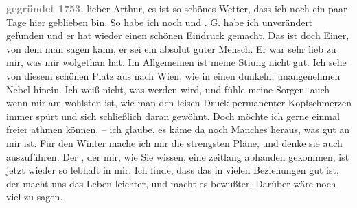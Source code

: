 \pstart
           \textcolor{gray}{\textbf{\textbf{gegründet 1753.}}}\pend
           \vspace{0.5em}
\pstart
           lieber Arthur, es ist so schönes Wetter, dass ich noch ein paar Tage
                  hier geblieben bin. So habe
               ich noch \label{K_L03274-1v}\label{K_L03274-1} und \label{K_L03274-2v}\label{K_L03274-2}. G. habe ich unverändert gefunden und
               er hat wieder einen schönen Eindruck gemacht. Das ist doch Einer, von dem man sagen
               kann, er sei ein absolut guter Mensch. Er war sehr lieb zu mir, was mir wolgethan
               hat. Im Allgemeinen ist meine Sti{\geminationm}ung nicht gut. Ich
               sehe von diesem schönen Platz aus nach Wien\textcolor{gray}{,} wie in einen dunkeln, unangenehmen Nebel hinein. Ich weiß nicht,
               was werden wird, und fühle meine Sorgen, auch wenn mir am wohlsten ist, wie man den
               leisen Druck permanenter Kopfschmerzen immer spürt und sich schließlich daran
               gewöhnt. Doch möchte ich gerne einmal freier athmen können, – ich glaube, {\pb}es käme da noch Manches
               heraus, was gut an mir ist. Für den Winter mache ich mir die strengsten Pläne, und
               denke sie auch auszuführen. Der \label{K_L03274-3v}\label{K_L03274-3}, der mir, wie Sie wissen, eine zeitlang abhanden gekommen, ist jetzt wieder
               so lebhaft in mir. Ich finde, dass das in vielen Beziehungen gut ist, der macht uns
               das Leben leichter, und macht es bewußter. Darüber wäre noch viel zu sagen.\pend
           

